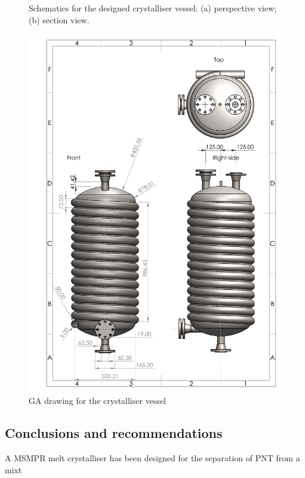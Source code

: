 \begin{figure}[h]
    \centering
    
    \caption{Schematics for the designed crystalliser vessel: (a) perspective view; (b) section view.}
    \label{fig:crystalliser schematic}
\end{figure}

\newpage
\begin{figure}[h!]
    \centering
    \includegraphics[scale=0.8]{chapters/3-separation/figures/Crystalliser_GA.PDF}
    \caption{GA drawing for the crystalliser vessel}
    \label{fig:crystalliser GA}
\end{figure} 

\newpage
\subsection{Conclusions and recommendations} \label{crystalliser conclusions}
A MSMPR melt crystalliser has been designed for the separation of PNT from a mixt